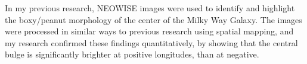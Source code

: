 \documentclass[]{letter}
\begin{document}
\begin{letter}
In my previous research, NEOWISE images were used to identify and highlight the boxy/peanut morphology of the center of the Milky Way Galaxy. The images were processed in similar ways to previous research using spatial mapping, and my research confirmed these findings quantitatively, by showing that the central bulge is significantly brighter at positive longitudes, than at negative. 

\end{letter}
\end{document}
